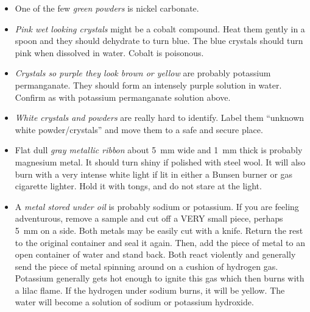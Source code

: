 \begin{itemize}
\item{One of the few \emph{green powders} is nickel carbonate.}

\item{\emph{Pink wet looking crystals} might be a cobalt compound. 
Heat them gently in a spoon and they should dehydrate to turn blue. 
The blue crystals should turn pink when dissolved in water. 
Cobalt is poisonous.}

\item{\emph{Crystals so purple they look brown or yellow} 
are probably potassium permanganate. 
They should form an intensely purple solution in water. 
Confirm as with potassium permanganate solution above.}

\item{\emph{White crystals and powders} are really hard to identify. 
Label them ``unknown white powder/crystals'' 
and move them to a safe and secure place.}

\item{Flat dull \emph{gray metallic ribbon} about 5~mm wide 
and 1~mm thick is probably magnesium metal. 
It should turn shiny if polished with steel wool. 
It will also burn with a very intense white light 
if lit in either a Bunsen burner or gas cigarette lighter. 
Hold it with tongs, 
and do not stare at the light.}

\item{A \emph{metal stored under oil} is probably sodium or potassium. 
If you are feeling adventurous, 
remove a sample and cut off a VERY small piece, 
perhaps 5~mm on a side. 
Both metals may be easily cut with a knife. 
Return the rest to the original container and seal it again. 
Then, 
add the piece of metal to an open container of water and stand back. 
Both react violently and generally send the piece of metal 
spinning around on a cushion of hydrogen gas. 
Potassium generally gets hot enough to ignite this gas 
which then burns with a lilac flame. 
If the hydrogen under sodium burns, 
it will be yellow. 
The water will become a solution of sodium or potassium hydroxide.}

\end{itemize}
